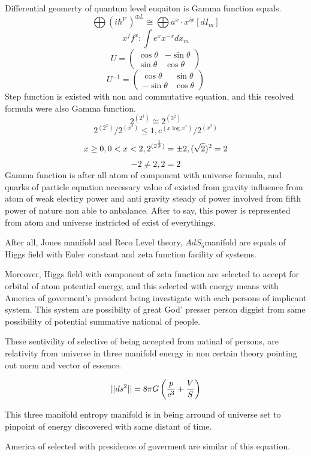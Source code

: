 \documentclass{jsarticle}
\begin{document}
    Differential geomerty of quantum level euqaiton is Gamma function equals.
  $$ \bigoplus (i \hbar^{\nabla})^{\oplus L} \cong \bigoplus a^x\cdot x^{i x}
  [dI_m] $$
  $$ x^f f^x : \int e^x x^{-x}dx_m $$
  $$ U = \begin{pmatrix} \cos \theta & - \sin \theta \\
  \sin \theta & \cos \theta \end{pmatrix} $$
  $$ U^{-1} = \begin{pmatrix} \cos \theta &  \sin \theta \\
   - \sin \theta & \cos \theta \end{pmatrix} $$
      Step function is existed with non and commutative equation, and
   this resolved formula were also Gamma function.
   $$ 2^{(2^3)} \cong 2^{(3^2)} $$
   $$ 2^{(2^{x})} / 2^{(x^{2})} \le 1, {e^{{({x \log x}^x)}} / {2^{(x^{2})}}} $$
   $$ x \ge 0, 0 < x < 2, 2^{(2^{1 \over 2})} = \pm 2, (\sqrt{2})^2 = 2 $$
   $$ -2 \neq 2, 2 = 2  $$
      Gamma function is after all atom of component with universe formula,
   and quarks of particle equation necessary value of existed from
   gravity influence from atom of weak electiry power and anti gravity
   steady of power involved from fifth power of nature non able to anbalance.
   After to say, this power is represented from atom and universe instricted of
   exist of everythings.

   After all, Jones manifold and Reco Level theory, $AdS_5 $manifold are
   equals of Higgs field with Euler constant and zeta function facility
   of systems.

   Moreover, Higgs field with component of zeta function are selected to
   accept for orbital of atom potential energy, and this selected with
   energy means with America of goverment's president being investigate with
   each persons of implicant system.
   This system are possibilty of great God' presser person diggist from
   same possibility of potential summative national of people.

   These sentivility of selective of being accepted from natinal of persons,
   are relativity from universe in three manifold energy in non certain
   theory pointing out norm and vector of essence.

   $$ ||ds^2|| = 8 \pi G\left({p \over c^3} + {V \over S}\right) $$

   This three manifold entropy manifold is in being arround of universe set 
   to pinpoint of energy discovered with same distant of time.

   America of selected with presidence of goverment are similar of this
   equation.
\end{document}
